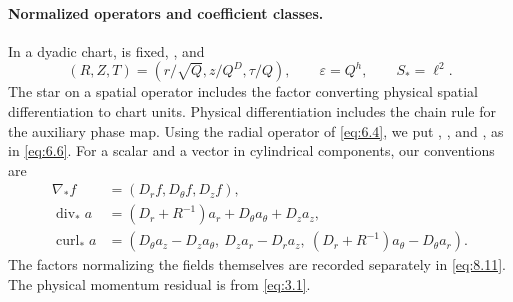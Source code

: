 \paragraph{Normalized operators and coefficient classes.}
In a dyadic chart,  is fixed,
, and
\[
(R,Z,T)=(r/\sqrt Q,z/Q^D,\tau/Q),
\qquad
\varepsilon=Q^h,
\qquad
S_*=\ell^2.
\]
The star on a spatial operator includes the factor  converting physical spatial differentiation to chart units. Physical differentiation includes the chain rule for the auxiliary
phase map. Using the radial operator  of \eqref{eq:6.4}, we put
,
, and
%
, as in \eqref{eq:6.6}. For a scalar
 and a vector
 in cylindrical components,
our conventions are
\begin{equation}
\begin{aligned}
\nabla_*f&=(D_rf,D_\theta f,D_zf),\\
\operatorname{div}_*a&=(D_r+R^{-1})a_r+D_\theta a_\theta+D_za_z,\\
\operatorname{curl}_*a&=(D_\theta a_z-D_za_\theta,\ D_za_r-D_ra_z,\ (D_r+R^{-1})a_\theta-D_\theta a_r).
\end{aligned}
\tag{3.11}\label{eq:3.11}
\end{equation}
The factors normalizing the fields themselves are recorded separately in \eqref{eq:8.11}. The physical
momentum residual is  from \eqref{eq:3.1}.

